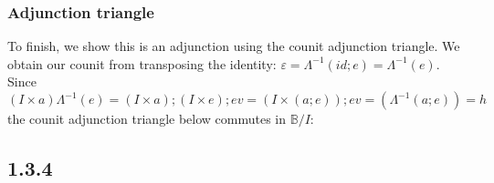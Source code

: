 \documentclass{article}
\begin{document}
\subsubsection*{Adjunction triangle}

To finish, we show this is an adjunction using the counit adjunction triangle.
We obtain our counit from transposing the identity: 
$\varepsilon = \Lambda^{-1}(\mathit{id};e) = \Lambda^{-1}(e)$. 
Since 
$$(I \times a)\Lambda^{-1}(e) = (I \times a);(I \times e);\mathit{ev} = (I \times (a;e));\mathit{ev} = (\Lambda^{-1}(a;e)) = h$$
the counit adjunction triangle below commutes in $\mathbb B / I$:
\begin{center}
\end{center}
 


\subsection*{1.3.4}
\end{document}
